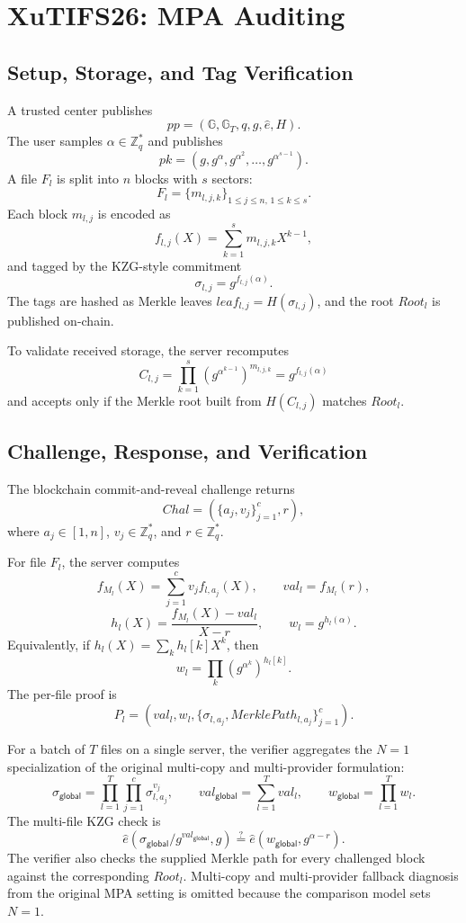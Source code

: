 \documentclass[11pt]{article}
\newcommand{\G}{\mathbb{G}}
\newcommand{\GT}{\mathbb{G}_T}
\newcommand{\Zq}{\mathbb{Z}_q}
\begin{document}
\section{XuTIFS26: MPA Auditing}

\subsection{Setup, Storage, and Tag Verification}

A trusted center publishes
\[
    pp=(\G,\GT,q,g,\hat e,H).
\]
The user samples \(\alpha\in\Zq^\ast\) and publishes
\[
    pk=(g,g^\alpha,g^{\alpha^2},\ldots,g^{\alpha^{s-1}}).
\]
A file \(F_l\) is split into \(n\) blocks with \(s\) sectors:
\[
    F_l=\{m_{l,j,k}\}_{1\le j\le n,\,1\le k\le s}.
\]
Each block \(m_{l,j}\) is encoded as
\[
    f_{l,j}(X)=\sum_{k=1}^{s}m_{l,j,k}X^{k-1},
\]
and tagged by the KZG-style commitment
\[
    \sigma_{l,j}=g^{f_{l,j}(\alpha)}.
\]
The tags are hashed as Merkle leaves \(leaf_{l,j}=H(\sigma_{l,j})\), and the
root \(Root_l\) is published on-chain.

To validate received storage, the server recomputes
\[
    C_{l,j}=\prod_{k=1}^{s}(g^{\alpha^{k-1}})^{m_{l,j,k}}
    =g^{f_{l,j}(\alpha)}
\]
and accepts only if the Merkle root built from \(H(C_{l,j})\) matches
\(Root_l\).

\subsection{Challenge, Response, and Verification}

The blockchain commit-and-reveal challenge returns
\[
    Chal=(\{a_j,v_j\}_{j=1}^{c},r),
\]
where \(a_j\in[1,n]\), \(v_j\in\Zq^\ast\), and \(r\in\Zq^\ast\).

For file \(F_l\), the server computes
\[
    f_{M_l}(X)=\sum_{j=1}^{c}v_j f_{l,a_j}(X),\qquad
    val_l=f_{M_l}(r),
\]
\[
    h_l(X)=\frac{f_{M_l}(X)-val_l}{X-r},\qquad
    w_l=g^{h_l(\alpha)}.
\]
Equivalently, if \(h_l(X)=\sum_k h_l[k]X^k\), then
\[
    w_l=\prod_k(g^{\alpha^k})^{h_l[k]}.
\]
The per-file proof is
\[
    P_l=(val_l,w_l,\{\sigma_{l,a_j},MerklePath_{l,a_j}\}_{j=1}^{c}).
\]

For a batch of \(T\) files on a single server, the verifier aggregates
the \(N=1\) specialization of the original multi-copy and multi-provider
formulation:
\[
    \sigma_{\mathsf{global}}
    =\prod_{l=1}^{T}\prod_{j=1}^{c}\sigma_{l,a_j}^{v_j},
    \qquad
    val_{\mathsf{global}}=\sum_{l=1}^{T}val_l,
    \qquad
    w_{\mathsf{global}}=\prod_{l=1}^{T}w_l.
\]
The multi-file KZG check is
\[
    \hat e(\sigma_{\mathsf{global}}/g^{val_{\mathsf{global}}},g)
    \stackrel{?}{=}
    \hat e(w_{\mathsf{global}},g^{\alpha-r}).
\]
The verifier also checks the supplied Merkle path for every challenged block
against the corresponding \(Root_l\).  Multi-copy and multi-provider fallback
diagnosis from the original MPA setting is omitted because the comparison
model sets \(N=1\).
\end{document}
